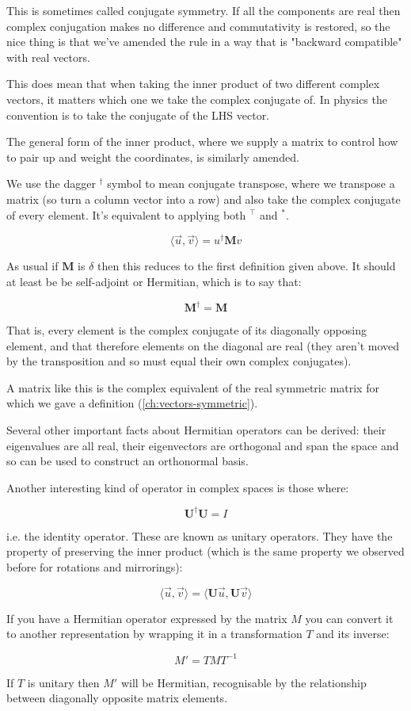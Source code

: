 This is sometimes called conjugate symmetry. If all the components are real then complex conjugation makes no difference and commutativity is restored, so the nice thing is that we've amended the rule in a way that is "backward compatible" with real vectors.

This does mean that when taking the inner product of two different complex vectors, it matters which one we take the complex conjugate of. In physics the convention is to take the conjugate of the LHS vector.

The general form of the inner product, where we supply a matrix to control how to pair up and weight the coordinates, is similarly amended.

We use the dagger $^\dagger$ symbol to mean conjugate transpose, where we transpose a matrix (so turn a column vector into a row) and also take the complex conjugate of every element. It's equivalent to applying both $^\intercal$ and $^*$.

$$
\langle \vec{u}, \vec{v} \rangle
=
u^\dagger \mathbf{M} v
$$

As usual if $\mathbf{M}$ is $\delta$ then this reduces to the first definition given above. It should at least be be self-adjoint or Hermitian, which is to say that:

$$\mathbf{M}^\dagger = \mathbf{M}$$

That is, every element is the complex conjugate of its diagonally opposing element, and that therefore elements on the diagonal are real (they aren't moved by the transposition and so must equal their own complex conjugates).

A matrix like this is the complex equivalent of the real symmetric matrix for which we gave a definition (\ref{ch:vectors-symmetric}).

Several other important facts about Hermitian operators can be derived: their eigenvalues are all real, their eigenvectors are orthogonal and span the space and so can be used to construct an orthonormal basis.

Another interesting kind of operator in complex spaces is those where:

$$\mathbf{U}^\dagger \mathbf{U} = I$$

i.e. the identity operator. These are known as unitary operators. They have the property of preserving the inner product (which is the same property we observed before for rotations and mirrorings):

$$\langle \vec{u}, \vec{v} \rangle = \langle \mathbf{U} \vec{u}, \mathbf{U} \vec{v} \rangle$$

If you have a Hermitian operator expressed by the matrix $M$ you can convert it to another representation by wrapping it in a transformation $T$ and its inverse:

$$M' = T M T^{-1}$$

If $T$ is unitary then $M'$ will be Hermitian, recognisable by the relationship between diagonally opposite matrix elements.